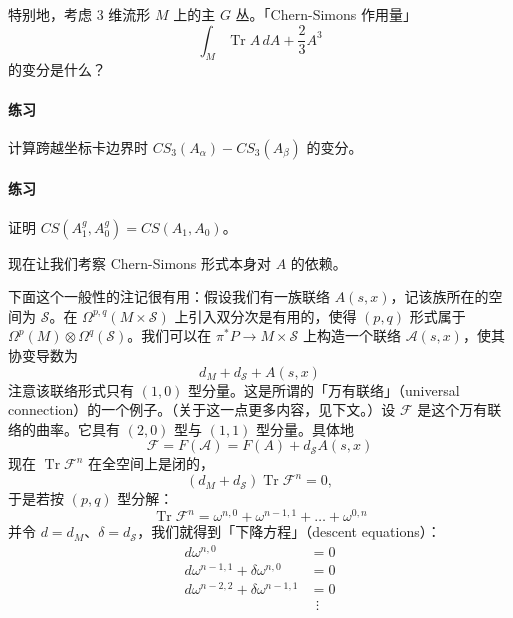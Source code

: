 特别地，考虑 3 维流形 $M$ 上的主 $G$ 丛。「Chern-Simons 作用量」
\begin{equation}
  \int_M \operatorname{Tr}A\,dA+\frac{2}{3}A^3
  \tag{I.37}
  \label{eq:I.37}
\end{equation}
的变分是什么？

\paragraph{练习}
计算跨越坐标卡边界时 $CS_3(A_\alpha)-CS_3(A_\beta)$ 的变分。

\paragraph{练习}
证明 $CS(A_1^g,A_0^g)=CS(A_1,A_0)$。

现在让我们考察 Chern-Simons 形式本身对 $A$ 的依赖。

下面这个一般性的注记很有用：假设我们有一族联络 $A(s,x)$，记该族所在的空间为 $\mathcal{S}$。在 $\Omega^{p,q}(M\times\mathcal{S})$ 上引入双分次是有用的，使得 $(p,q)$ 形式属于 $\Omega^p(M)\otimes\Omega^q(\mathcal{S})$。我们可以在 $\pi^*P\to M\times\mathcal{S}$ 上构造一个联络 $\mathcal{A}(s,x)$，使其协变导数为
\begin{equation}
  d_M+d_{\mathcal{S}}+A(s,x)
  \tag{I.38}
  \label{eq:I.38}
\end{equation}
注意该联络形式只有 $(1,0)$ 型分量。这是所谓的「万有联络」（universal connection）的一个例子。（关于这一点更多内容，见下文。）设 $\mathcal{F}$ 是这个万有联络的曲率。它具有 $(2,0)$ 型与 $(1,1)$ 型分量。具体地
\begin{equation}
  \mathcal{F} = F(\mathcal{A}) = F(A)+d_{\mathcal{S}}A(s,x)
  \tag{I.39}
  \label{eq:I.39}
\end{equation}
现在 $\operatorname{Tr}\mathcal{F}^n$ 在全空间上是闭的，
\begin{equation}
  (d_M+d_{\mathcal{S}})\operatorname{Tr}\mathcal{F}^n = 0,
  \tag{I.40}
  \label{eq:I.40}
\end{equation}
于是若按 $(p,q)$ 型分解：
\begin{equation}
  \operatorname{Tr}\mathcal{F}^n = \omega^{n,0}+\omega^{n-1,1}+\dots+\omega^{0,n}
  \tag{I.41}
  \label{eq:I.41}
\end{equation}
并令 $d=d_M$、$\delta=d_{\mathcal{S}}$，我们就得到「下降方程」（descent equations）：
\begin{equation}
\begin{aligned}
  d\omega^{n,0} &= 0\\
  d\omega^{n-1,1}+\delta\omega^{n,0} &= 0\\
  d\omega^{n-2,2}+\delta\omega^{n-1,1} &= 0\\
  &\ \ \vdots
\end{aligned}
  \tag{I.42}
  \label{eq:I.42}
\end{equation}

